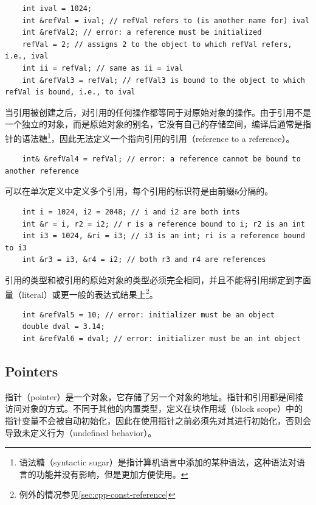 \begin{verbatim}
    int ival = 1024;
    int &refVal = ival; // refVal refers to (is another name for) ival
    int &refVal2; // error: a reference must be initialized
    refVal = 2; // assigns 2 to the object to which refVal refers, i.e., ival
    int ii = refVal; // same as ii = ival
    int &refVal3 = refVal; // refVal3 is bound to the object to which refVal is bound, i.e., to ival
\end{verbatim}

当引用被创建之后，对引用的任何操作都等同于对原始对象的操作。由于引用不是一个独立的对象，而是原始对象的别名，它没有自己的存储空间，编译后通常是指针的语法糖\footnote{语法糖（syntactic sugar）是指计算机语言中添加的某种语法，这种语法对语言的功能并没有影响，但是更加方便使用。}，因此无法定义一个指向引用的引用（reference to a reference）。

\begin{verbatim}
    int& &refVal4 = refVal; // error: a reference cannot be bound to another reference
\end{verbatim}

可以在单次定义中定义多个引用，每个引用的标识符是由前缀\texttt{&}分隔的。

\begin{verbatim}
    int i = 1024, i2 = 2048; // i and i2 are both ints
    int &r = i, r2 = i2; // r is a reference bound to i; r2 is an int
    int i3 = 1024, &ri = i3; // i3 is an int; ri is a reference bound to i3
    int &r3 = i3, &r4 = i2; // both r3 and r4 are references
\end{verbatim}

引用的类型和被引用的原始对象的类型必须完全相同，并且不能将引用绑定到字面量（literal）或更一般的表达式结果上\footnote{例外的情况参见\ref{sec:cpp-const-reference}}。

\begin{verbatim}
    int &refVal5 = 10; // error: initializer must be an object
    double dval = 3.14;
    int &refVal6 = dval; // error: initializer must be an int object
\end{verbatim}

\subsection{Pointers}
指针（pointer）是一个对象，它存储了另一个对象的地址。指针和引用都是间接访问对象的方式。不同于其他的内置类型，定义在块作用域（block scope）中的指针变量不会被自动初始化，因此在使用指针之前必须先对其进行初始化，否则会导致未定义行为（undefined behavior）。

